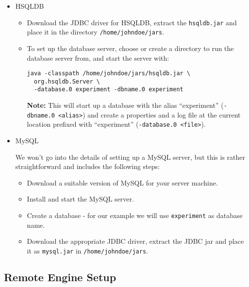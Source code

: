 \documentclass[a4paper]{article}
\begin{document}
\begin{itemize}
	\item HSQLDB
	
		\begin{itemize}
			\item Download the JDBC driver for HSQLDB, extract the \texttt{hsqldb.jar} and place it in the directory \texttt{/home/johndoe/jars}.
			
			\item To set up the database server, choose or create a directory to run the database server from, and start the server with:

				\begin{verbatim}
java -classpath /home/johndoe/jars/hsqldb.jar \
  org.hsqldb.Server \
  -database.0 experiment -dbname.0 experiment
				\end{verbatim}
				
				\textbf{Note:} This will start up a database with the alias ``experiment'' (\texttt{-dbname.0 <alias>}) and create a properties and a log file at the current location prefixed with ``experiment'' (\texttt{-database.0 <file>}).
				
		\end{itemize}
		
	\item MySQL
	
We won't go into the details of setting up a MySQL server, but this is rather straightforward and includes the following steps:

		\begin{itemize}
  			\item Download a suitable version of MySQL for your server machine.
  			\item Install and start the MySQL server.
  			\item Create a database - for our example we will use \texttt{experiment} as database name.
  			\item Download the appropriate JDBC driver, extract the JDBC jar and place it as \texttt{mysql.jar} in \texttt{/home/johndoe/jars}.
		\end{itemize}
		
\end{itemize}

\subsection{Remote Engine Setup}
\end{document}
